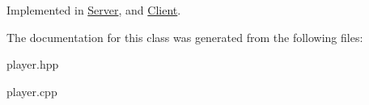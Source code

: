 Implemented in \hyperlink{classServer_aff65d0adf4570f2b1ffca2d961191901}{Server}, and \hyperlink{classClient_a3e7762d65e93ab094373c5e80506f93b}{Client}.



The documentation for this class was generated from the following files\+:\begin{DoxyCompactItemize}
\item 
player.\+hpp\item 
player.\+cpp\end{DoxyCompactItemize}
